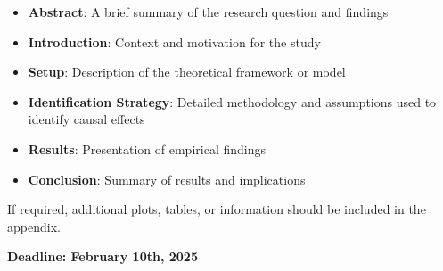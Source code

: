 \documentclass[12pt]{article}
\begin{document}
\begin{itemize}
    \item \textbf{Abstract}: A brief summary of the research question and findings
    \item \textbf{Introduction}: Context and motivation for the study
    \item \textbf{Setup}: Description of the theoretical framework or model
    \item \textbf{Identification Strategy}: Detailed methodology and assumptions used to identify causal effects
    \item \textbf{Results}: Presentation of empirical findings
    \item \textbf{Conclusion}: Summary of results and implications
\end{itemize}

If required, additional plots, tables, or information should be included in the appendix.

\textbf{Deadline: February 10th, 2025}
\end{document}
